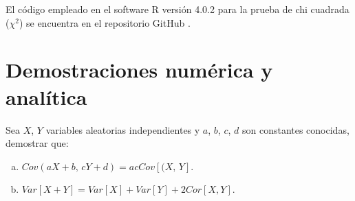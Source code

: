 \documentclass{article}
\begin{document}
El código empleado en el software R versión 4.0.2 \cite{r} para la prueba de chi cuadrada ($\chi^{2}$) se encuentra en el repositorio GitHub \cite{github}.

\section{Demostraciones numérica y analítica}

Sea $X$, $Y$ variables aleatorias independientes y $a$, $b$, $c$, $d$ son constantes conocidas, demostrar que:

\begin{enumerate}[(a)]
    \item $Cov(aX + b, \, cY + d) = acCov[(X, \, Y]$.
    \item $Var[X + Y] = Var[X] + Var[Y] + 2Cor[X,Y]$.
\end{enumerate}
\end{document}
